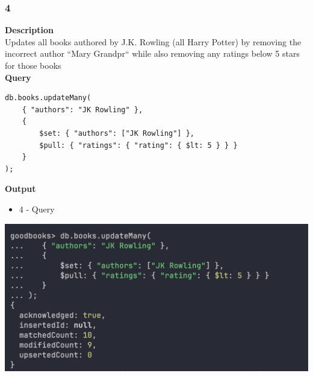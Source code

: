 \documentclass[11pt]{article}
\begin{document}
\subsubsection{4}
\label{sec:orgd06be3c}
\textbf{Description}\\
Updates all books authored by J.K. Rowling (all Harry Potter) by removing the incorrect author “Mary Grandpr`` while also removing any ratings below 5 stars for those books\\
\linebreak
\textbf{Query}
\begin{verbatim}
db.books.updateMany(
    { "authors": "JK Rowling" },
    {
        $set: { "authors": ["JK Rowling"] },
        $pull: { "ratings": { "rating": { $lt: 5 } } }
    }
);
\end{verbatim}

\linebreak
\textbf{Output}\\

\begin{itemize}
\item 4 - Query
\end{itemize}
\begin{center}
\includegraphics[width=1\textwidth]{images/KFWJOR001/4-query.png}
\end{center}
\end{document}
